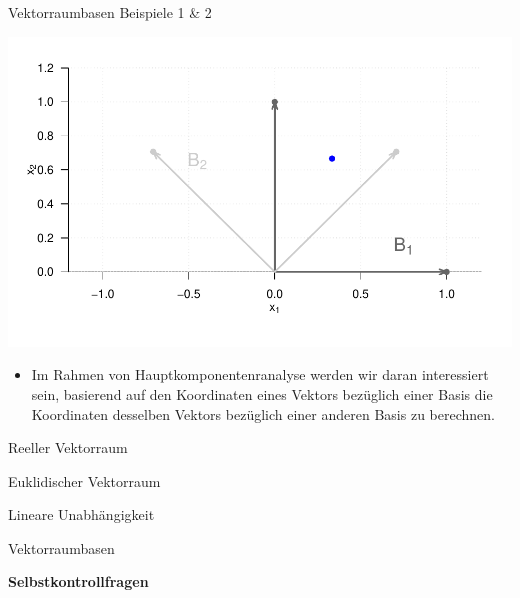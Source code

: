 \documentclass[
  8pt,
  ignorenonframetext,
]{beamer}
\providecommand{\tightlist}{%
  \setlength{\itemsep}{0pt}\setlength{\parskip}{0pt}}
\begin{document}
\begin{frame}{Vektorraumbasen}
\protect\hypertarget{vektorraumbasen-8}{}
Beispiele 1 \& 2

\begin{center}\includegraphics[width=0.8\linewidth]{2_Abbildungen/mvda_2_basen_R2} \end{center}

\small

\begin{itemize}
\tightlist
\item
  \justifying Im Rahmen von Hauptkomponentenranalyse werden wir daran
  interessiert sein, basierend auf den Koordinaten eines Vektors
  bezüglich einer Basis die Koordinaten desselben Vektors bezüglich
  einer anderen Basis zu berechnen.
\end{itemize}
\end{frame}

\begin{frame}{}
\protect\hypertarget{section-8}{}
\large
\vfill

Reeller Vektorraum

Euklidischer Vektorraum

Lineare Unabhängigkeit

Vektorraumbasen

\textbf{Selbstkontrollfragen} \vfill
\end{frame}
\end{document}
